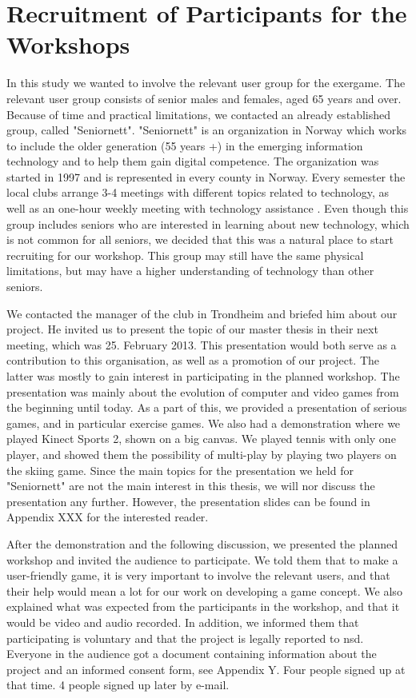 \section{Recruitment of Participants for the Workshops}
\label{sec:recruitment}
In this study we wanted to involve the relevant user group for the exergame. The relevant user group consists of senior males and females, aged 65 years and over. Because of time and practical limitations, we contacted an already established group, called "Seniornett". "Seniornett" is an organization in Norway which works to include the older generation (55 years +) in the emerging information technology and to help them gain digital competence. The organization was started in 1997 and is represented in every county in Norway.  Every semester the local clubs arrange 3-4 meetings with different topics related to technology, as well as an one-hour weekly meeting with technology assistance \cite{seniornett}. Even though this group includes seniors who are interested in learning about new technology, which is not common for all seniors, we decided that this was a natural place to start recruiting for our workshop. This group may still have the same physical limitations, but may have a higher understanding of technology than other seniors. 

We contacted the manager of the club in Trondheim and briefed him about our project. He invited us to present the topic of our master thesis in their next meeting, which was 25. February 2013. This presentation would both serve as a contribution to this organisation, as well as a promotion of our project. The latter was mostly to gain interest in participating in the planned workshop. The presentation was mainly about the evolution of computer and video games from the beginning until today. As a part of this, we provided a presentation of serious games, and in particular exercise games. We also had a demonstration where we played Kinect Sports 2, shown on a big canvas. We played tennis with only one player, and showed them the possibility of multi-play by playing two players on the skiing game. Since the main topics for the presentation we held for "Seniornett" are not the main interest in this thesis, we will nor discuss the presentation any further. However, the presentation slides can be found in Appendix XXX for the interested reader. 

After the demonstration and the following discussion, we presented the planned workshop and invited the audience to participate. We told them that to make a user-friendly game, it is very important to involve the relevant users, and that their help would mean a lot for our work on developing a game concept. We also explained what was expected from the participants in the workshop, and that it would be video and audio recorded. In addition, we informed them that participating is voluntary and that the project is legally reported to \ac{nsd}. Everyone in the audience got a document containing information about the project and an informed consent form, see Appendix Y. Four people signed up at that time. 4 people signed up later by e-mail.

